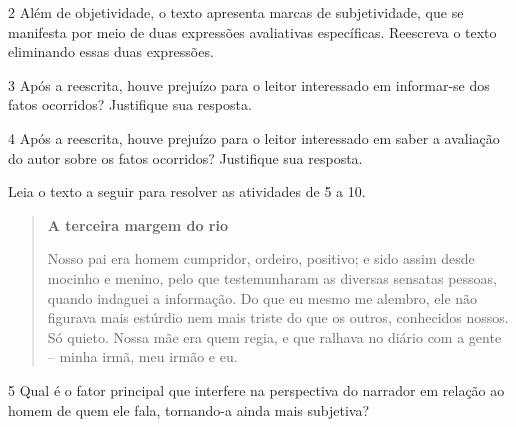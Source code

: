 \num{2} Além de objetividade, o texto apresenta marcas de subjetividade,
que se manifesta por meio de duas expressões avaliativas específicas.
Reescreva o texto eliminando essas duas expressões.


\num{3} Após a reescrita, houve prejuízo para o leitor interessado em
informar-se dos fatos ocorridos? Justifique sua resposta.


\num{4} Após a reescrita, houve prejuízo para o leitor interessado em
saber a avaliação do autor sobre os fatos ocorridos? Justifique sua
resposta.


Leia o texto a seguir para resolver as atividades de 5 a 10.

\begin{quote}
\textbf{A terceira margem do rio}

Nosso pai era homem cumpridor, ordeiro, positivo; e sido assim desde
mocinho e menino, pelo que testemunharam as diversas sensatas pessoas,
quando indaguei a informação. Do que eu mesmo me alembro, ele não
figurava mais estúrdio nem mais triste do que os outros, conhecidos
nossos. Só quieto. Nossa mãe era quem regia, e que ralhava no diário com
a gente -- minha irmã, meu irmão e eu.
\end{quote}


\num{5} Qual é o fator principal que interfere na perspectiva do
narrador em relação ao homem de quem ele fala, tornando-a ainda mais
subjetiva?


